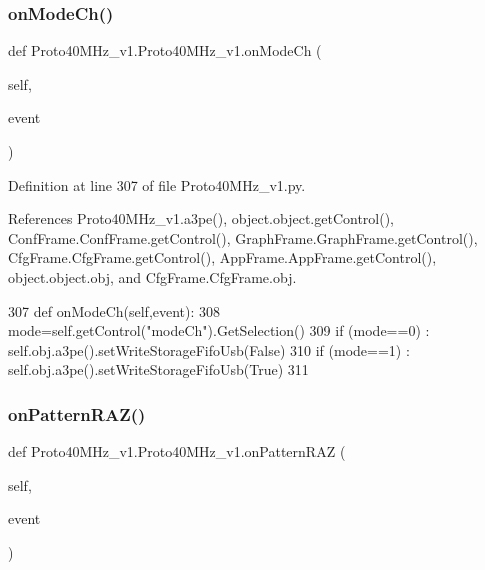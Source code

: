 \subsubsection{\texorpdfstring{on\+Mode\+Ch()}{onModeCh()}}
{\footnotesize\ttfamily def Proto40\+M\+Hz\+\_\+v1.\+Proto40\+M\+Hz\+\_\+v1.\+on\+Mode\+Ch (\begin{DoxyParamCaption}\item[{}]{self,  }\item[{}]{event }\end{DoxyParamCaption})}



Definition at line 307 of file Proto40\+M\+Hz\+\_\+v1.\+py.



References Proto40\+M\+Hz\+\_\+v1.\+a3pe(), object.\+object.\+get\+Control(), Conf\+Frame.\+Conf\+Frame.\+get\+Control(), Graph\+Frame.\+Graph\+Frame.\+get\+Control(), Cfg\+Frame.\+Cfg\+Frame.\+get\+Control(), App\+Frame.\+App\+Frame.\+get\+Control(), object.\+object.\+obj, and Cfg\+Frame.\+Cfg\+Frame.\+obj.


\begin{DoxyCode}
307     \textcolor{keyword}{def }onModeCh(self,event):
308         mode=self.getControl(\textcolor{stringliteral}{"modeCh"}).GetSelection()
309         \textcolor{keywordflow}{if} (mode==0) : self.obj.a3pe().setWriteStorageFifoUsb(\textcolor{keyword}{False})
310         \textcolor{keywordflow}{if} (mode==1) : self.obj.a3pe().setWriteStorageFifoUsb(\textcolor{keyword}{True})
311 
\end{DoxyCode}
\mbox{\label{classProto40MHz__v1_1_1Proto40MHz__v1_a4ab762dab8eaef531e74cb43c8e3b399}} 
\subsubsection{\texorpdfstring{on\+Pattern\+R\+A\+Z()}{onPatternRAZ()}}
{\footnotesize\ttfamily def Proto40\+M\+Hz\+\_\+v1.\+Proto40\+M\+Hz\+\_\+v1.\+on\+Pattern\+R\+AZ (\begin{DoxyParamCaption}\item[{}]{self,  }\item[{}]{event }\end{DoxyParamCaption})}



